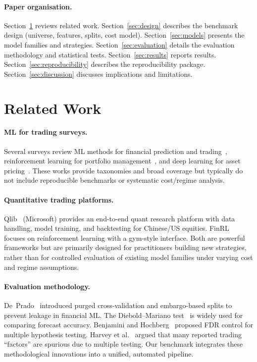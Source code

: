 \documentclass[11pt]{article}
\begin{document}
\paragraph{Paper organisation.}
Section~\ref{sec:related} reviews related work.
Section~\ref{sec:design} describes the benchmark design (universe, features, splits, cost model).
Section~\ref{sec:models} presents the model families and strategies.
Section~\ref{sec:evaluation} details the evaluation methodology and statistical tests.
Section~\ref{sec:results} reports results.
Section~\ref{sec:reproducibility} describes the reproducibility package.
Section~\ref{sec:discussion} discusses implications and limitations.


\section{Related Work}
\label{sec:related}

\paragraph{ML for trading surveys.}
Several surveys review ML methods for financial prediction and trading~\citep{ref14,ref16}, reinforcement learning for portfolio management~\citep{ref7,ref10}, and deep learning for asset pricing~\citep{ref15}.
These works provide taxonomies and broad coverage but typically do not include reproducible benchmarks or systematic cost/regime analysis.

\paragraph{Quantitative trading platforms.}
Qlib~\citep{ref11} (Microsoft) provides an end-to-end quant research platform with data handling, model training, and backtesting for Chinese/US equities.
FinRL~\citep{ref81} focuses on reinforcement learning with a gym-style interface.
Both are powerful frameworks but are primarily designed for practitioners building new strategies, rather than for controlled evaluation of existing model families under varying cost and regime assumptions.

\paragraph{Evaluation methodology.}
De~Prado~\citep{ref42,ref5} introduced purged cross-validation and embargo-based splits to prevent leakage in financial ML.
The Diebold--Mariano test~\citep{ref_dm} is widely used for comparing forecast accuracy.
Benjamini and Hochberg~\citep{ref_bh} proposed FDR control for multiple hypothesis testing.
Harvey et al.~\citep{ref_harvey} argued that many reported trading ``factors'' are spurious due to multiple testing.
Our benchmark integrates these methodological innovations into a unified, automated pipeline.
\end{document}
